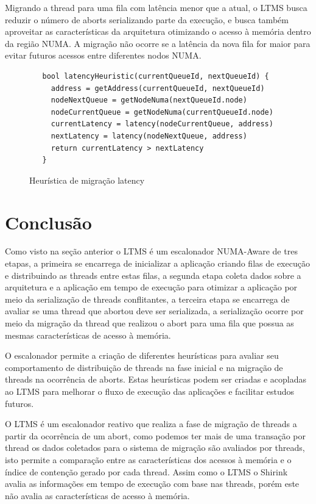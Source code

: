 \documentclass[diss,capa]{texufpel}
\begin{document}
Migrando a thread para uma fila com latência menor que a atual, o LTMS busca reduzir o número de aborts serializando parte da execução, e busca também aproveitar as características da arquitetura otimizando o acesso à memória dentro da região NUMA. A migração não ocorre se a latência da nova fila for maior para evitar futuros acessos entre diferentes nodos NUMA.

\begin{figure}[htbp]
 \centering
 \begin{lstlisting}
   bool latencyHeuristic(currentQueueId, nextQueueId) {
     address = getAddress(currentQueueId, nextQueueId)
     nodeNextQueue = getNodeNuma(nextQueueId.node)
     nodeCurrentQueue = getNodeNuma(currentQueueId.node)
     currentLatency = latency(nodeCurrentQueue, address)
     nextLatency = latency(nodeNextQueue, address)
     return currentLatency > nextLatency
   }
 \end{lstlisting}
 \caption{Heurística de migração latency}
\label{latency}
\end{figure}

\section{Conclusão}

Como visto na seção anterior o LTMS é um escalonador NUMA-Aware de tres etapas, a primeira se encarrega de inicializar a aplicação criando filas de execução e distribuindo as threads entre estas filas, a segunda etapa coleta dados sobre a arquitetura e a aplicação em tempo de execução para otimizar a aplicação por meio da serialização de threads conflitantes, a terceira etapa se encarrega de avaliar se uma thread que abortou deve ser serializada, a serialização ocorre por meio da migração da thread que realizou o abort para uma fila que possua as mesmas características de acesso à memória.

O escalonador permite a criação de diferentes heurísticas para avaliar seu comportamento de distribuição de threads na fase inicial e na migração de threads na ocorrência de aborts. Estas heurísticas podem ser criadas e acopladas ao LTMS para melhorar o fluxo de execução das aplicações e facilitar estudos futuros.

O LTMS é um escalonador reativo que realiza a fase de migração de threads a partir da ocorrência de um abort, como podemos ter mais de uma transação por thread os dados coletados para o sistema de migração são avaliados por threads, isto permite a comparação entre as características dos acessos à memória e o índice de contenção gerado por cada thread. Assim como o LTMS o Shirink~\cite{shirink2009} avalia as informações em tempo de execução com base nas threads, porém este não avalia as características de acesso à memória.
\end{document}
